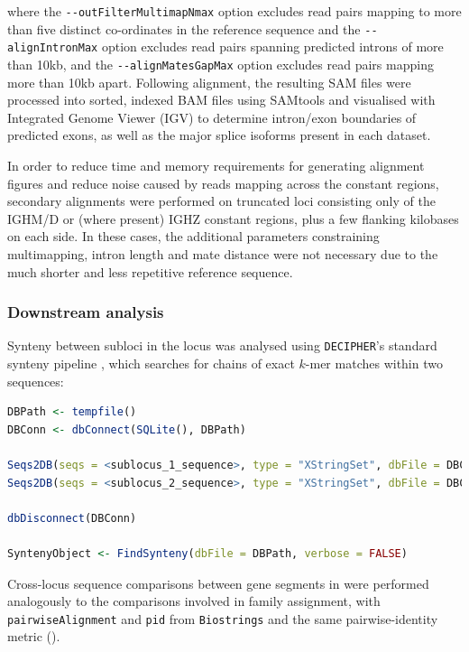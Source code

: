 where the \lstinline{--outFilterMultimapNmax} option excludes read pairs mapping to more than five distinct co-ordinates in the reference sequence and the \lstinline{--alignIntronMax} option excludes read pairs spanning predicted introns of more than 10kb, and the \lstinline{--alignMatesGapMax} option excludes read pairs mapping more than 10kb apart. Following alignment, the resulting SAM files were processed into sorted, indexed BAM files using SAMtools and visualised with Integrated Genome Viewer (IGV) to determine intron/exon boundaries of predicted exons, as well as the major splice isoforms present in each dataset.

In order to reduce time and memory requirements for generating alignment figures and reduce noise caused by reads mapping  across the constant regions, secondary alignments were performed on truncated loci consisting only of the IGHM/D or (where present) IGHZ constant regions, plus a few flanking kilobases on each side. In these cases, the additional parameters constraining multimapping, intron length and mate distance were not necessary due to the much shorter and less repetitive reference sequence.

\subsubsection{Downstream analysis}


Synteny between subloci in the \Nfu locus was analysed using \lstinline[language=R]{DECIPHER}'s standard synteny pipeline \parencite{wright2016decipher}, which searches for chains of exact $k$-mer matches within two sequences:

\begin{lstlisting}[language=R]
DBPath <- tempfile()
DBConn <- dbConnect(SQLite(), DBPath)

Seqs2DB(seqs = <sublocus_1_sequence>, type = "XStringSet", dbFile = DBConn, identifier = "IGH1", verbose = FALSE)
Seqs2DB(seqs = <sublocus_2_sequence>, type = "XStringSet", dbFile = DBConn, identifier = "IGH2", verbose = FALSE)

dbDisconnect(DBConn)

SyntenyObject <- FindSynteny(dbFile = DBPath, verbose = FALSE)
\end{lstlisting}

Cross-locus sequence comparisons between gene segments in \Nfu were performed analogously to the comparisons involved in \vh family assignment, with \lstinline[language=R]{pairwiseAlignment} and \lstinline[language=R]{pid} from \lstinline[language=R]{Biostrings} and the same pairwise-identity metric ().

